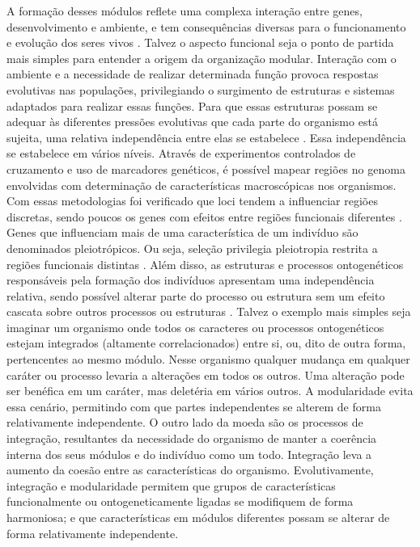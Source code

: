 A formação desses módulos reflete uma complexa interação entre genes,
desenvolvimento e ambiente, e tem consequências diversas para o
funcionamento e evolução dos seres vivos \citep{Wagner1996}.
Talvez o aspecto funcional seja o ponto de partida mais simples para
entender a origem da organização modular.
Interação com o ambiente e a necessidade de realizar determinada função
provoca respostas evolutivas nas populações, privilegiando o surgimento
de estruturas e sistemas adaptados para realizar essas funções.
Para que essas estruturas possam se adequar às diferentes pressões
evolutivas que cada parte do organismo está sujeita, uma relativa
independência entre elas se estabelece \citep{Wagner2007, Klingenberg2008}.
Essa independência se estabelece em vários níveis.
Através de experimentos controlados de cruzamento e uso de marcadores
genéticos, é possível mapear regiões no genoma envolvidas com
determinação de características macroscópicas nos organismos.
Com essas metodologias foi verificado que loci tendem a influenciar
regiões discretas, sendo poucos os genes com efeitos entre regiões
funcionais diferentes \citep{Cheverud1997}.
Genes que influenciam mais de uma característica de um indivíduo são
denominados pleiotrópicos.
Ou seja, seleção privilegia pleiotropia restrita a regiões funcionais
distintas \citep{Cheverud1984}.
Além disso, as estruturas e processos ontogenéticos responsáveis pela
formação dos indivíduos apresentam uma independência relativa, sendo
possível alterar parte do processo ou estrutura sem um efeito cascata
sobre outros processos ou estruturas \citep{Klingenberg2008}.
Talvez o exemplo mais simples seja imaginar um organismo onde todos os
caracteres ou processos ontogenéticos estejam integrados (altamente
correlacionados) entre si, ou, dito de outra forma, pertencentes ao mesmo módulo.
Nesse organismo qualquer mudança em qualquer caráter ou processo levaria
a alterações em todos os outros.
Uma alteração pode ser benéfica em um caráter, mas deletéria em vários
outros.
A modularidade evita essa cenário, permitindo com que partes
independentes se alterem de forma relativamente independente.
O outro lado da moeda são os processos de integração, resultantes da
necessidade do organismo de manter a coerência interna dos seus módulos
e do indivíduo como um todo.
Integração leva a aumento da coesão entre as características
do organismo.
Evolutivamente, integração e modularidade permitem que grupos de
características funcionalmente ou ontogeneticamente ligadas se
modifiquem de forma harmoniosa; e que características em módulos
diferentes possam se alterar de forma relativamente independente.

